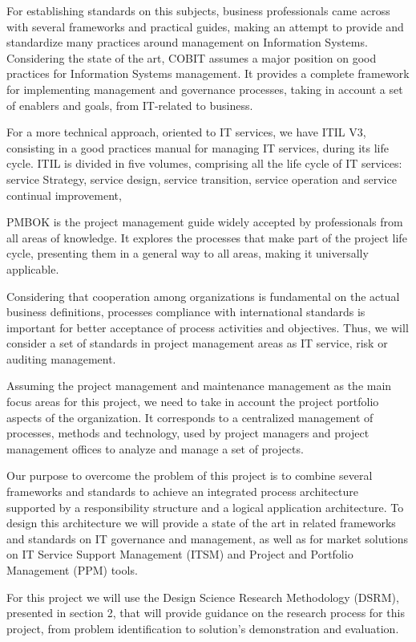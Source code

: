 For establishing standards on this subjects, business professionals came across with several frameworks and practical guides, making an attempt to provide and standardize many practices around management on Information Systems. Considering the state of the art, COBIT assumes a major position on good practices for Information Systems management. It provides a complete framework for implementing management and governance processes, taking in account a set of enablers and goals, from IT-related to business.\par
For a more technical approach, oriented to IT services, we have ITIL V3, consisting in a good practices manual for managing IT services, during its life cycle. ITIL is divided in five volumes, comprising all the life cycle of IT services: service Strategy, service design, service transition, service operation and service continual improvement,\par
PMBOK is the project management guide widely accepted by professionals from all areas of knowledge. It explores the processes that make part of the project life cycle, presenting them in a general way to all areas, making it universally applicable.\par
Considering that cooperation among organizations is fundamental on the actual business definitions, processes compliance with international standards is important for better acceptance of process activities and objectives. Thus, we will consider a set of standards in project management areas as IT service, risk or auditing management.\par   
Assuming the project management and maintenance management as the main focus areas for this project, we need to take in account the project portfolio aspects of the organization. It corresponds to a centralized management of processes, methods and technology, used by project managers and project management offices to analyze and manage a set of projects.\par
Our purpose to overcome the problem of this project is to combine several frameworks and standards to achieve an integrated process architecture supported by a responsibility structure and a logical application architecture. To design this architecture we will provide a state of the art in related frameworks and standards on IT governance and management, as well as for market solutions on IT Service Support Management (ITSM) and Project and Portfolio Management (PPM) tools.\par
For this project we will use the Design Science Research Methodology (DSRM)\cite{DSRM}, presented in section 2, that will provide guidance on the research process for this project, from problem identification to solution's demonstration and evaluation.\par